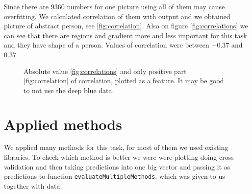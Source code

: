 \documentclass[]{article}
\begin{document}
  Since there are $9360$ numbers for one picture using all of them may cause overfitting. We calculated correlation of them with output and we obtained picture of abstract person, see \ref{fig:correlation}.
  Also on figure \ref{fig:correlations} we can see that there are regions and gradient more and less important for this task and they have shape of a person. Values of correlation were between $-0.37$ and $0.37$
  \begin{figure}[t]
    \center
      \;\;\;
    \caption{Absolute value \ref{fig:correlations} and only positive part \ref{fig:correlation} of correlation, plotted as a feature. It may be good to not use the deep blue data.}
  \end{figure}
   

\section{Applied methods}
We applied many methods for this task, for most of them we used existing libraries. To check which method is better we were were plotting doing cross-validation and then taking predictions into one big vector and passing it as predictions to function \verb+evaluateMultipleMethods+, which was given to us together with data. 
\end{document}
